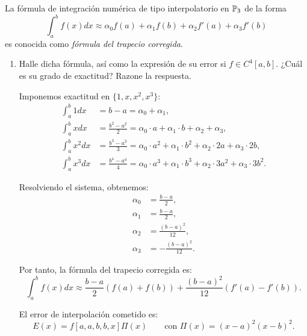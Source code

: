 \begin{ejercicio}\label{ej:2.1.16}
    La fórmula de integración numérica de tipo interpolatorio en $\mathbb{P}_3$ de la forma
    \begin{equation*}
        \int_{a}^{b} f(x) dx \approx \alpha_0 f(a) + \alpha_1 f(b) + \alpha_2 f'(a) + \alpha_3 f'(b)
    \end{equation*}
    es conocida como \emph{fórmula del trapecio corregida}.
    \begin{enumerate}
        \item Halle dicha fórmula, así como la expresión de su error si $f \in C^4[a, b]$. ¿Cuál es su grado de exactitud? Razone la respuesta.
        
        Imponemos exactitud en $\{1,x,x^2,x^3\}$:
        \begin{align*}
            \int_{a}^{b} 1 dx &= b - a = \alpha_0 + \alpha_1,\\
            \int_{a}^{b} x dx &= \frac{b^2 - a^2}{2} = \alpha_0\cdot a + \alpha_1\cdot b + \alpha_2 + \alpha_3,\\
            \int_{a}^{b} x^2 dx &= \frac{b^3 - a^3}{3} = \alpha_0\cdot a^2 + \alpha_1\cdot b^2 + \alpha_2\cdot 2a + \alpha_3\cdot 2b,\\
            \int_{a}^{b} x^3 dx &= \frac{b^4 - a^4}{4} = \alpha_0\cdot a^3 + \alpha_1\cdot b^3 + \alpha_2\cdot 3a^2 + \alpha_3\cdot 3b^2.
        \end{align*}

        Resolviendo el sistema, obtenemos:
        \begin{align*}
            \alpha_0 &= \frac{b - a}{2},\\
            \alpha_1 &= \frac{b - a}{2},\\
            \alpha_2 &= \frac{(b - a)^2}{12},\\
            \alpha_3 &= -\frac{(b - a)^2}{12}.
        \end{align*}

        Por tanto, la fórmula del trapecio corregida es:
        \begin{equation*}
            \int_{a}^{b} f(x) dx \approx \frac{b - a}{2}\left( f(a) + f(b) \right) + \frac{(b - a)^2}{12}\left( f'(a) - f'(b) \right).
        \end{equation*}

        El error de interpolación cometido es:
        \begin{equation*}
            E(x) = f[a,a,b,b,x]\Pi(x)\qquad \text{con } \Pi(x) = (x - a)^2(x - b)^2.
        \end{equation*}


\end{enumerate}
\end{ejercicio}
